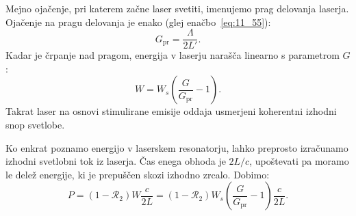 Mejno ojačenje, pri katerem začne laser svetiti, imenujemo prag
delovanja laserja. Ojačenje na pragu delovanja je enako 
(glej enačbo~\ref{eq:11_55}):
\begin{equation}
G_\mathrm{pr} = \frac{\Lambda}{2L'}.
\label{eq:11_56}
\end{equation}
Kadar je črpanje nad pragom, energija v laserju narašča linearno s 
parametrom $G$:
\begin{equation}
W = W_s \left(\frac{G}{G_\mathrm{pr}} - 1\right)\!\!.
\label{eq:11_57}
\end{equation}
Takrat laser na osnovi stimulirane emisije oddaja usmerjeni 
koherentni izhodni snop svetlobe.

Ko enkrat poznamo energijo v laserskem resonatorju, lahko preprosto
izračunamo izhodni svetlobni tok iz laserja. Čas enega obhoda je $2L/c$,
upoštevati pa moramo le delež energije, ki je prepuščen skozi izhodno zrcalo. 
Dobimo: 
\begin{equation}
P = (1-\mathcal{R}_2) W \frac{c}{2L}
= (1-\mathcal{R}_2) W_s \left( \frac{G}{G_\mathrm{pr}}-1\right) \frac{c}{2L}.
\label{eq:11_58}
\end{equation}

